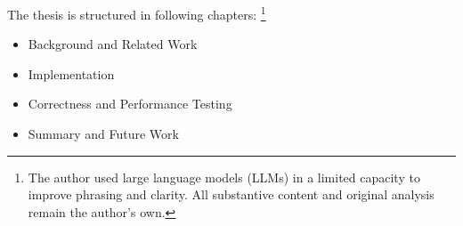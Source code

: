 The thesis is structured in following chapters: \footnote{The author used large language models (LLMs) in a limited capacity to improve phrasing and clarity. All substantive content and original analysis remain the author's own.}

\begin{itemize}
  \item Background and Related Work
  \item Implementation
  \item Correctness and Performance Testing
  \item Summary and Future Work
\end{itemize}
